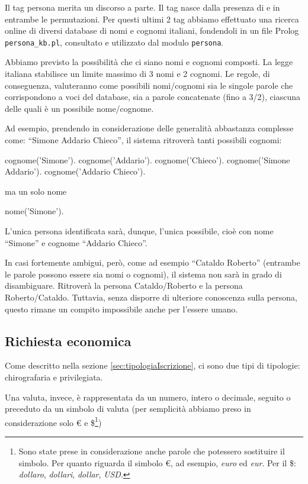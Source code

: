 Il tag persona merita un discorso a parte.
Il tag  nasce dalla presenza di  e  in entrambe le permutazioni.
Per questi ultimi 2 tag abbiamo effettuato una ricerca online di diversi database di nomi e cognomi italiani, fondendoli in un file Prolog \verb|persona_kb.pl|, consultato e utilizzato dal modulo \verb|persona|.

Abbiamo previsto la possibilità che ci siano nomi e cognomi composti. La legge italiana stabilisce un limite massimo di 3 nomi e 2 cognomi.
Le regole, di conseguenza, valuteranno come possibili nomi/cognomi sia le singole parole che corrispondono a voci del database, sia a parole concatenate (fino a 3/2), ciascuna delle quali è un possibile nome/cognome.

Ad esempio, prendendo in considerazione delle generalità abbastanza complesse come: ``Simone Addario Chieco'', il sistema ritroverà tanti possibili cognomi:

\begin{prologcode}
cognome('Simone').
cognome('Addario').
cognome('Chieco').
cognome('Simone Addario').
cognome('Addario Chieco').
\end{prologcode}

ma un solo nome

\begin{prologcode}
nome('Simone').
\end{prologcode}

L'unica persona identificata sarà, dunque, l'unica possibile, cioè con nome ``Simone'' e cognome ``Addario Chieco''.

In casi fortemente ambigui, però, come ad esempio ``Cataldo Roberto'' (entrambe le parole possono essere sia nomi o cognomi), il sistema non sarà in grado di disambiguare. Ritroverà la persona Cataldo/Roberto e la persona Roberto/Cataldo. Tuttavia, senza disporre di ulteriore conoscenza sulla persona, questo rimane un compito impossibile anche per l'essere umano.

\subsection{Richiesta economica}

Come descritto nella sezione \ref{sec:tipologiaIscrizione}, ci sono due tipi di tipologie: chirografaria e privilegiata.

Una valuta, invece, è rappresentata da un numero, intero o decimale, seguito o preceduto da un simbolo di valuta (per semplicità abbiamo preso in considerazione solo € e \$\footnote{Sono state prese in considerazione anche parole che potessero sostituire il simbolo. Per quanto riguarda il simbolo €, ad esempio, \emph{euro} ed \emph{eur}. Per il \$: \emph{dollaro}, \emph{dollari}, \emph{dollar}, \emph{USD}.})

